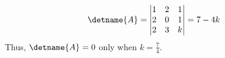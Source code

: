 %
\begin{align*}
\detname{A} &= 
\begin{vmatrix} 
1 & 2 & 1 \\ 
2 & 0 & 1 \\ 
2& 3 & k 
\end{vmatrix} 
= 7 - 4k
\end{align*}
Thus, $\detname{A} = 0$ only when $k = \frac{7}{4}$.